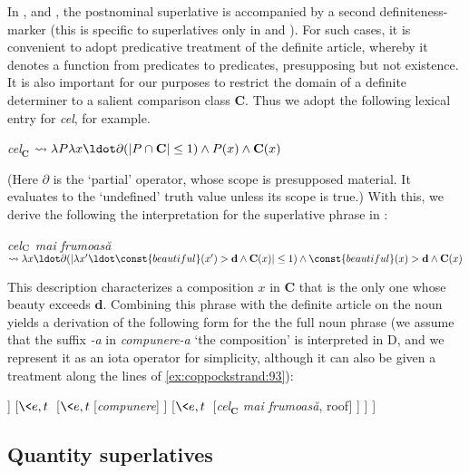 \documentclass[output=paper
,modfonts
,nonflat]{langsci/langscibook}
\begin{document}
In ,  and , the postnominal superlative is accompanied by a second definiteness-marker (this is specific to superlatives only in  and ). For such cases, it is convenient to adopt  predicative treatment of the definite article, whereby it denotes a function from predicates to predicates, presupposing  but not existence. It is also important for our purposes to restrict the domain of a definite determiner to a salient comparison class $\textbf{C}$. Thus we adopt the following lexical entry for  \textit{cel}, for example.

\ea \label{ex:coppockstrand:93}
\textit{cel}$_{\textbf{C}}$ $\leadsto \lambda P \lambda x \ldot \partial(|P\cap \textbf{C}|\leq 1) \land P(x) \land \textbf{C}(x)$
\z 

(Here $\partial$ is the `partial' operator, whose scope is presupposed material. It evaluates to the `undefined' truth value unless its scope is true.) With this, we derive the following the interpretation for the superlative phrase in :

\ea \label{ex:coppockstrand:94}
{\em cel$_{\textbf{\textnormal{C}}}$ mai frumoasă} $\leadsto \lambda x \ldot \partial(|\lambda x'\ldot \const{beautiful}(x') > \textbf{d} \land \textbf{C}(x)|\leq 1) \land \const{beautiful}(x) > \textbf{d} \land \textbf{C}(x)$ 
\z 

This description characterizes a composition $x$ in $\textbf{C}$ that is the only one whose beauty exceeds $\textbf{d}$. Combining this phrase with the definite article on the noun yields a derivation of the following form for the the full noun phrase (we assume that the suffix \textit{-a} in \textit{compunere-a} `the composition' is interpreted in D, and we represent it as an iota operator for simplicity, although it can also be given a treatment along the lines of \ref{ex:coppockstrand:93}):

\ea{}
\begin{forest}
	[{$e$}
		[{$\<\<\tau,t,\>,\tau\>$}[\textit{-a}]
		]
		[{$\<e,t\>$}
			[{$\<e,t\>$}[\textit{compunere}]
			]
			[{$\<e,t\>$} [\textit{cel}$_{\textbf{C}}$ \textit{mai frumoasă}, roof]
			]
		]
	]
\end{forest}
\z 

\subsection{Quantity superlatives}
\end{document}

